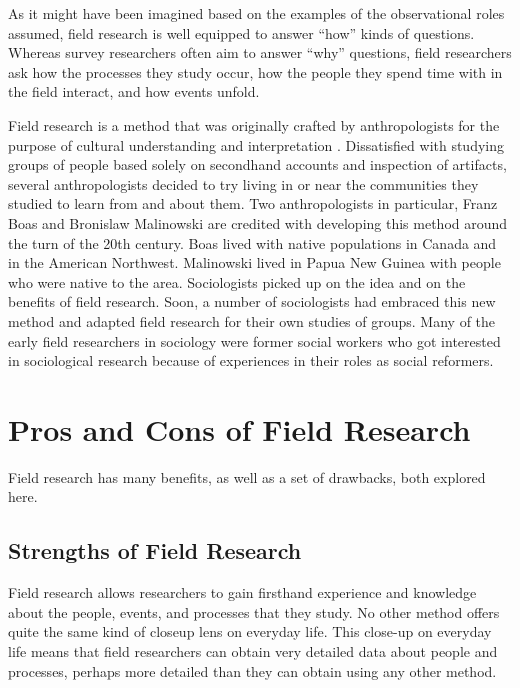As it might have been imagined based on the examples of the observational roles assumed, field research is well equipped to answer ``how'' kinds of questions. Whereas survey researchers often aim to answer ``why'' questions, field researchers ask how the processes they study occur, how the people they spend time with in the field interact, and how events unfold. 

Field research is a method that was originally crafted by anthropologists for the purpose of cultural understanding and interpretation \cite{wolcott1999ethnography}. Dissatisfied with studying groups of people based solely on secondhand accounts and inspection of artifacts, several anthropologists decided to try living in or near the communities they studied to learn from and about them. Two anthropologists in particular, Franz Boas \cite{boas1964central} and Bronislaw Malinowski \cite{malinowski2014argonauts} are credited with developing this method around the turn of the 20th century. Boas lived with native populations in Canada and in the American Northwest. Malinowski lived in Papua New Guinea with people who were native to the area. Sociologists picked up on the idea and on the benefits of field research. Soon, a number of sociologists had embraced this new method and adapted field research for their own studies of groups. Many of the early field researchers in sociology were former social workers who got interested in sociological research because of experiences in their roles as social reformers. 

\section{Pros and Cons of Field Research}

Field research has many benefits, as well as a set of drawbacks, both explored here.

\subsection{Strengths of Field Research}

Field research allows researchers to gain firsthand experience and knowledge about the people, events, and processes that they study. No other method offers quite the same kind of closeup lens on everyday life. This close-up on everyday life means that field researchers can obtain very detailed data about people and processes, perhaps more detailed than they can obtain using any other method.

